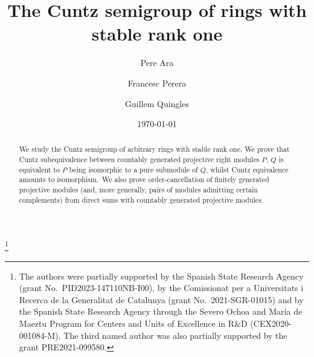 \documentclass[11pt]{amsart}
\numberwithin{equation}{section}
\theoremstyle{definition}
\theoremstyle{plain}
\theoremstyle{definition}
\begin{document}
\title[Cuntz semigroups and stable rank one]{The Cuntz semigroup of rings with stable rank one}

\author{Pere Ara}
\author{Francesc Perera}

\author{Guillem Quingles}

\date{\today}

\address{P.~Ara,
Departament de Matem\`{a}tiques,
Universitat Aut\`{o}noma de Barcelona,
 Bellaterra, Barcelona, Spain}
\address{
F.~Perera, 
Departament de Matem\`{a}tiques,
Universitat Aut\`{o}noma de Barcelona,
 Bellaterra, Barcelona, Spain, and
Centre de Recerca Matem\`atica, Edifici Cc, Campus de Bellaterra,  08193 Cerdanyola del Vall\`es, Barcelona, Spain}


\address{Guillem~Quingles, 
Departament de Matem\`{a}tiques,
Universitat Aut\`{o}noma de Barcelona,
 Bellaterra, Barcelona, Spain}



\thanks{
 The authors were partially supported by the Spanish State Research Agency (grant No.\  PID2023-147110NB-I00), by the Comissionat per a Universitats i Recerca de la Generalitat de Ca\-ta\-lu\-nya (grant No.\ 2021-SGR-01015) and by the Spanish State Research Agency through the Severo Ochoa and María de Maeztu Program for Centers and Units of Excellence in R\&D (CEX2020-001084-M).
 The third named author was also partially supported by the grant PRE2021-099580.
 }

\begin{abstract}
We study the Cuntz semigroup of arbitrary rings with stable rank one. We prove that Cuntz subequivalence between countably generated projective right modules $P$, $Q$ is equivalent to $P$ being isomorphic to a pure submodule of $Q$, whilst Cuntz equivalence amounts to isomorphism.~We also prove order-cancellation of finitely generated projective modules (and, more generally, pairs of modules admitting certain complements) from direct sums with countably generated projective modules.
\end{abstract}
\end{document}

